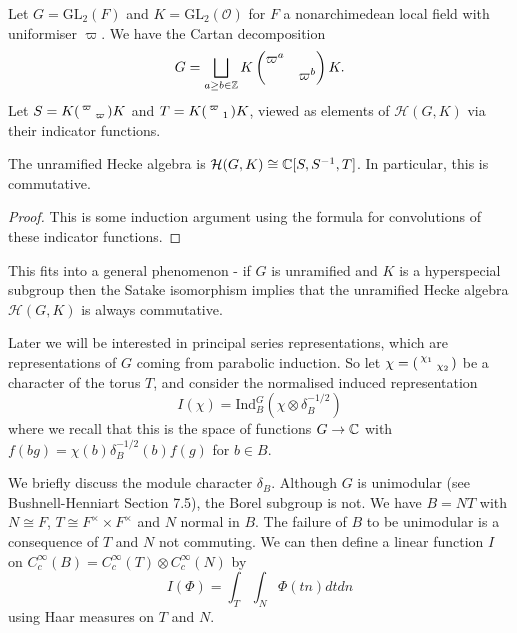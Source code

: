 Let $G=\mathrm{GL}_2(F)$ and $K=\mathrm{GL}_2(\mathcal O)$ for $F$ a nonarchimedean local field with uniformiser $\varpi$. We have the Cartan decomposition $$G = \bigsqcup\limits_{a \geq b \in \mathbb{Z}} K \begin{pmatrix} \varpi^a & \\ & \varpi^b \end{pmatrix}K.$$ Let $S=K \begin{psmallmatrix} \varpi & \\ & \varpi \end{psmallmatrix}K$ and $T=K \begin{psmallmatrix} \varpi & \\ & 1 \end{psmallmatrix}K$, viewed as elements of $\mathcal H(G,K)$ via their indicator functions.

\begin{lemma}
    The unramified Hecke algebra is $\mathcal H(G,K) \cong \mathbb{C}[S,S^{-1},T]$. In particular, this is commutative.
\end{lemma}
\begin{proof}
    This is some induction argument using the formula for convolutions of these indicator functions.
\end{proof}

\begin{rem}
    This fits into a general phenomenon - if $G$ is unramified and $K$ is a hyperspecial subgroup then the Satake isomorphism implies that the unramified Hecke algebra $\mathcal H(G,K)$ is always commutative.
\end{rem}

Later we will be interested in principal series representations, which are representations of $G$ coming from parabolic induction. So let $\chi = \begin{psmallmatrix}
    \chi_1 & \\ & \chi_2
\end{psmallmatrix}$ be a character of the torus $T$, and consider the normalised induced representation $$I(\chi) = \mathrm{Ind}_B^G \left( \chi \otimes \delta_B^{-1/2}\right)$$
where we recall that this is the space of functions $G \to \mathbb{C}$ with $f(bg) = \chi(b)\delta_B^{-1/2}(b) f(g)$ for $b \in B$.

We briefly discuss the module character $\delta_B$. Although $G$ is unimodular (see Bushnell-Henniart Section 7.5), the Borel subgroup is not. We have $B=NT$ with $N\cong F$, $T \cong F^\times \times F^\times$ and $N$ normal in $B$. The failure of $B$ to be unimodular is a consequence of $T$ and $N$ not commuting. We can then define a linear function $I$ on $C_c^\infty(B) = C_c^\infty(T) \otimes C_c^\infty(N)$ by
$$I(\Phi) = \int_T\int_N \Phi(tn) dt dn$$ using Haar measures on $T$ and $N$.

